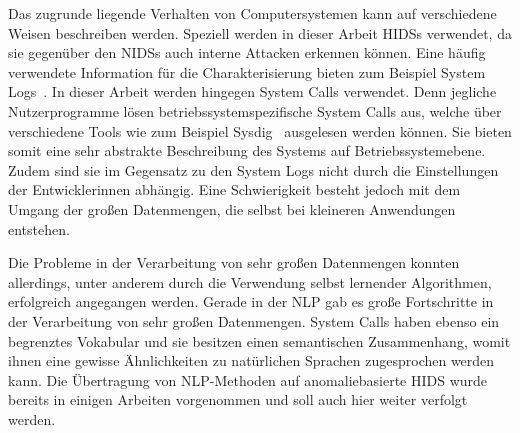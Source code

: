 

%


Das zugrunde liegende Verhalten von Computersystemen kann auf verschiedene Weisen beschreiben werden.
Speziell werden in dieser Arbeit \acfp{HIDS} verwendet, da sie gegenüber den \acp{NIDS} auch interne Attacken erkennen können.
Eine häufig verwendete Information für die Charakterisierung bieten zum Beispiel System Logs~\cite{HE}.
In dieser Arbeit werden hingegen System Calls verwendet.
Denn jegliche Nutzerprogramme lösen betriebssystemspezifische System Calls aus, welche über verschiedene Tools wie zum Beispiel Sysdig~\cite{SYSDIG} ausgelesen werden können.
Sie bieten somit eine sehr abstrakte Beschreibung des Systems auf Betriebssystemebene.
Zudem sind sie im Gegensatz zu den System Logs nicht durch die Einstellungen der Entwicklerinnen abhängig.
Eine Schwierigkeit besteht jedoch mit dem Umgang der großen Datenmengen, die selbst bei kleineren Anwendungen entstehen.

Die Probleme in der Verarbeitung von sehr großen Datenmengen konnten allerdings, unter anderem durch die Verwendung selbst lernender Algorithmen, erfolgreich angegangen werden.
Gerade in der \acf{NLP} gab es große Fortschritte in der Verarbeitung von sehr großen Datenmengen.
System Calls haben ebenso ein begrenztes Vokabular und sie besitzen einen semantischen Zusammenhang, womit ihnen eine gewisse Ähnlichkeiten zu natürlichen Sprachen zugesprochen werden kann.
Die Übertragung von \ac{NLP}-Methoden auf anomaliebasierte \ac{HIDS} wurde bereits in einigen Arbeiten vorgenommen und soll auch hier weiter verfolgt werden.

